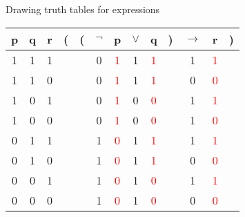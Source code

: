 \documentclass[
  ignorenonframetext,
]{beamer}
\begin{document}
\begin{frame}{Drawing truth tables for expressions}
\protect\hypertarget{drawing-truth-tables-for-expressions}{}

\begin{tabular}{@{ }c@{ }@{ }c@{ }@{ }c | c@{}@{}c@{}@{ }c@{ }@{ }c@{ }@{ }c@{ }@{ }c@{ }@{}c@{}@{ }c@{ }@{ }c@{ }@{}c@{ }}
p & q & r & ( & ( & $\neg$ & p & $\vee$ & q & ) & $\rightarrow$ & r & )\\
\hline 
1 & 1 & 1 &  &  & 0 & \textcolor{red}{1} & 1 & \textcolor{red}{1} &  & 1 & \textcolor{red}{1} & \\
1 & 1 & 0 &  &  & 0 & \textcolor{red}{1} & 1 & \textcolor{red}{1} &  & 0 & \textcolor{red}{0} & \\
1 & 0 & 1 &  &  & 0 & \textcolor{red}{1} & 0 & \textcolor{red}{0} &  & 1 & \textcolor{red}{1} & \\
1 & 0 & 0 &  &  & 0 & \textcolor{red}{1} & 0 & \textcolor{red}{0} &  & 1 & \textcolor{red}{0} & \\
0 & 1 & 1 &  &  & 1 & \textcolor{red}{0} & 1 & \textcolor{red}{1} &  & 1 & \textcolor{red}{1} & \\
0 & 1 & 0 &  &  & 1 & \textcolor{red}{0} & 1 & \textcolor{red}{1} &  & 0 & \textcolor{red}{0} & \\
0 & 0 & 1 &  &  & 1 & \textcolor{red}{0} & 1 & \textcolor{red}{0} &  & 1 & \textcolor{red}{1} & \\
0 & 0 & 0 &  &  & 1 & \textcolor{red}{0} & 1 & \textcolor{red}{0} &  & 0 & \textcolor{red}{0} & \\
\end{tabular}

\end{frame}
\end{document}
